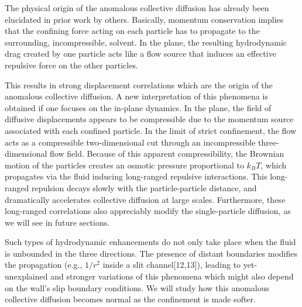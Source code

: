 \documentclass[ twoside,openright,titlepage,numbers=noenddot,%
headinclude,footinclude,cleardoublepage=empty,abstract=on,
BCOR=5mm,paper=a4,fontsize=11pt, dvipsnames
]{scrreprt}
\newcommand{\kT}{k_B T}
\begin{document}
The physical origin of the anomalous collective diffusion has already been elucidated in prior work by others\cite{Bleibel2014,Bleibel2016,Bleibel2015,Dominguez2014}. Basically, momentum conservation implies that the confining force acting on each particle has to propagate to the surrounding, incompressible, solvent. In the plane, the resulting hydrodynamic drag created by one particle acts like a flow source that induces an effective repulsive force on the other particles.

This results in strong displacement correlations which are the origin of the anomalous collective diffusion.
A new interpretation of this phenomena is obtained if one focuses on the in-plane dynamics.
In the plane, the field of diffusive displacements appears to be compressible due to the momentum source associated with each confined particle.
In the limit of strict confinement, the flow acts as a compressible two-dimensional cut through an incompressible three-dimensional flow field.
Because of this apparent compressibility, the Brownian motion of the particles creates an osmotic pressure proportional to $\kT$, which propagates via the fluid inducing long-ranged repulsive interactions.
This long-ranged repulsion decays slowly with the particle-particle distance, and dramatically accelerates collective diffusion at large scales.
Furthermore,
these long-ranged correlations also appreciably modify the single-particle diffusion, as we will see in future sections.

Such types of hydrodynamic enhancements do not only take place when the fluid is unbounded in the three directions. The presence of distant boundaries modifies the propagation (e.g., $1/r^2$ inside a slit channel[12,13]), leading to yet-unexplained and stronger variations of this phenomena which might also depend on the wall's slip boundary conditions.
We will study how this anomalous collective diffusion becomes normal as the confinement is made softer.
\end{document}
